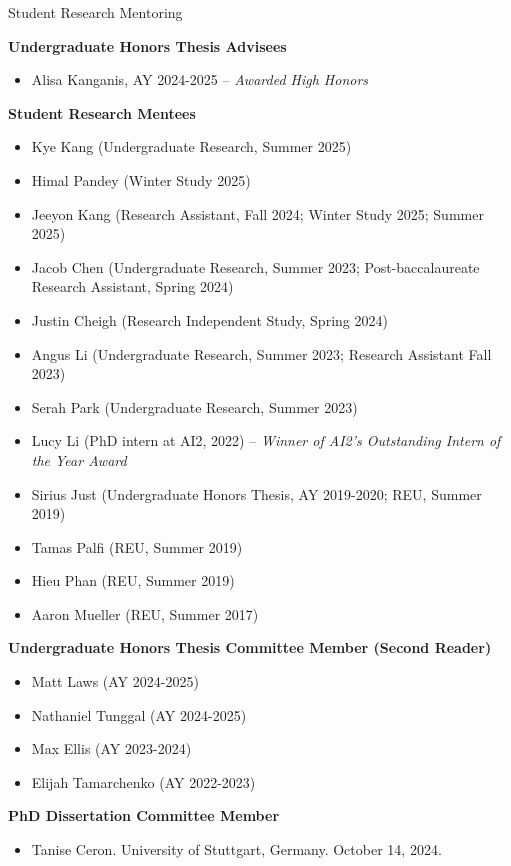\documentclass{resume} %
\begin{document}
\begin{rSection}{Student Research Mentoring}

\textbf{Undergraduate Honors Thesis Advisees}
\begin{itemize}[leftmargin=0.5cm]
\item Alisa Kanganis, AY 2024-2025 -- \emph{Awarded High Honors}
\end{itemize}

\textbf{Student Research Mentees}
\begin{itemize}[leftmargin=0.5cm]
\item Kye Kang (Undergraduate Research, Summer 2025)
\item Himal Pandey (Winter Study 2025)
\item Jeeyon Kang (Research Assistant, Fall 2024; Winter Study 2025; Summer 2025)
\item Jacob Chen (Undergraduate Research, Summer 2023; Post-baccalaureate Research Assistant, Spring 2024)
\item Justin Cheigh (Research Independent Study, Spring 2024)
\item Angus Li (Undergraduate Research, Summer 2023; Research Assistant Fall 2023)

\item Serah Park (Undergraduate Research, Summer 2023)
\item Lucy Li (PhD intern at AI2, 2022) -- \emph{Winner of AI2's Outstanding Intern of the Year Award}
\item Sirius Just (Undergraduate Honors Thesis, AY 2019-2020; REU, Summer 2019) 
\item Tamas Palfi (REU, Summer 2019) 
\item Hieu Phan (REU, Summer 2019) 
\item Aaron Mueller (REU, Summer 2017) 
\end{itemize}


\textbf{Undergraduate Honors Thesis Committee Member (Second Reader)}

    \begin{itemize}[leftmargin=0.5cm]
    \item Matt Laws (AY 2024-2025)
    \item Nathaniel Tunggal (AY 2024-2025)
    \item Max Ellis (AY 2023-2024)
    \item Elijah Tamarchenko (AY 2022-2023)
    \end{itemize}

\textbf{PhD Dissertation Committee Member}

\begin{itemize}[leftmargin=0.5cm]
    \item Tanise Ceron. University of Stuttgart, Germany. October 14, 2024. 
\end{itemize}

\end{rSection}
\end{document}
